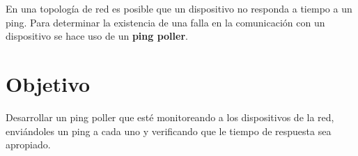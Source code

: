 %

En una topología de red es posible que un dispositivo no responda a tiempo a un ping. Para determinar la existencia de una falla en la comunicación con un dispositivo se hace uso de un \textbf{ping poller}.

\section{Objetivo}

Desarrollar un ping poller que esté monitoreando a los dispositivos de la red, enviándoles un ping a cada uno y verificando que le tiempo de respuesta sea apropiado.